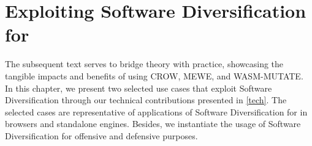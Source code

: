 \chapter{Exploiting Software Diversification for \Wasm}
\label{exploit}

The subsequent text serves to bridge theory with practice, showcasing the tangible impacts and benefits of using CROW, MEWE, and WASM-MUTATE.
In this chapter, we present two selected use cases that exploit Software Diversification through our technical contributions presented in \autoref{tech}.
The selected cases are representative of applications of Software Diversification for \Wasm in browsers and standalone engines.
Besides, we instantiate the usage of Software Diversification for offensive and defensive purposes.








